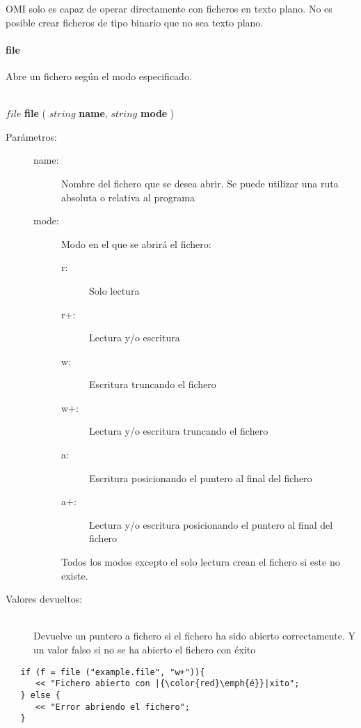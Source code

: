 OMI solo es capaz de operar directamente con ficheros en texto plano. No es posible crear 
ficheros de tipo binario que no sea texto plano.

\paragraph{file}
Abre un fichero según el modo especificado. 

\begin{framed}
\hfill \\ $file$ \textbf{file} ( $string$ \textbf{name}, $string$ \textbf{mode}  )  
\begin{description}
\item [Parámetros:] \hfill 
   \begin{description}
   \item[name:] Nombre del fichero que se desea abrir. Se puede utilizar una ruta absoluta o relativa al programa
   \item[mode:] Modo en el que se abrirá el fichero:
      \begin{description}
         \item [r:] Solo lectura
         \item [r+:] Lectura y/o escritura
         \item [w:] Escritura truncando el fichero
         \item [w+:] Lectura y/o escritura truncando el fichero
         \item [a:] Escritura posicionando el puntero al final del fichero
         \item [a+:] Lectura y/o escritura posicionando el puntero al final del fichero
      \end{description} \hfill 
      
      Todos los modos excepto el solo lectura crean el fichero si este no existe. 
   \end{description}
\item[Valores devueltos:] \hfill \\
   Devuelve un puntero a fichero si el fichero ha sido abierto correctamente. Y un valor falso si no se ha 
   abierto el fichero con éxito
\end{description}
\end{framed}

\begin{lstlisting}  
   if (f = file ("example.file", "w+")){
      << "Fichero abierto con |{\color{red}\emph{é}}|xito";
   } else {
      << "Error abriendo el fichero";
   }
\end{lstlisting}

